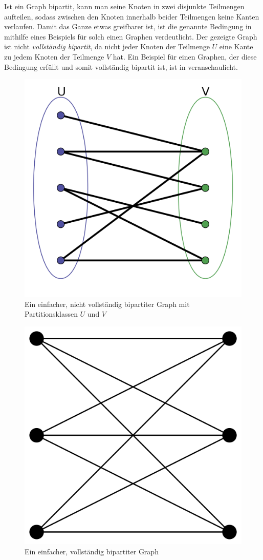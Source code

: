             Ist ein Graph bipartit, kann man seine Knoten in zwei disjunkte Teilmengen aufteilen, sodass zwischen den Knoten innerhalb beider Teilmengen keine Kanten verlaufen. Damit das Ganze etwas greifbarer ist, ist die genannte Bedingung in  mithilfe eines Beispiels für solch einen Graphen verdeutlicht. Der gezeigte Graph ist nicht \emph{vollständig bipartit}, da nicht jeder Knoten der Teilmenge $U$ eine Kante zu jedem Knoten der Teilmenge $V$ hat. Ein Beispiel für einen Graphen, der diese Bedingung erfüllt und somit vollständig bipartit ist, ist in  veranschaulicht. \cite{EZ:Web12, EZ:Web19}

            \begin{figure}
                \centering
                \includegraphics[width=0.4\linewidth]{images/bipartite-graph.png}
                \caption{Ein einfacher, nicht vollständig bipartiter Graph mit Partitionsklassen $U$ und $V$\\\cite{EZ:Web19}}
                \label{fig:bipartite-graph}
            \end{figure}

            \begin{figure}
                \centering
                \includegraphics[width=0.3\linewidth]{images/complete-bipartite-graph.png}
                \caption{Ein einfacher, vollständig bipartiter Graph\\\cite{EZ:Web19}}
                \label{fig:complete-bipartite-graph}
            \end{figure}

